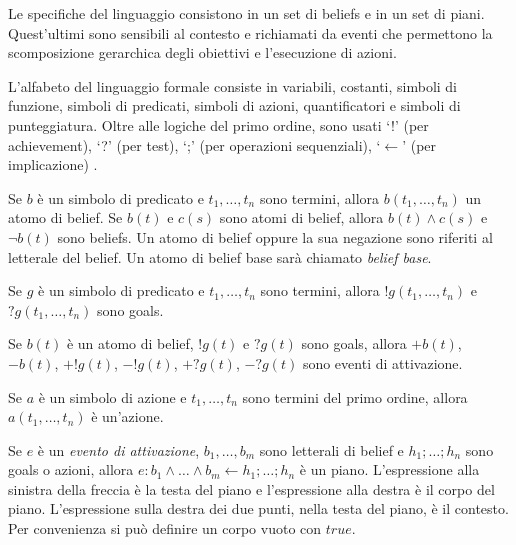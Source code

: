 \medskip
Le specifiche del linguaggio consistono in un set di beliefs e in un set di piani. Quest'ultimi sono sensibili al contesto e richiamati da eventi che permettono la scomposizione gerarchica degli obiettivi e l'esecuzione di azioni.

L'alfabeto del linguaggio formale consiste in variabili, costanti, simboli di funzione, simboli di predicati, simboli di azioni, quantificatori e simboli di punteggiatura. Oltre alle logiche del primo ordine, sono usati `!' (per achievement), `?' (per test), `;' (per operazioni sequenziali), `$\leftarrow$' (per implicazione) \cite{AgentSpeak(L)}.

\smallskip
\begin{defn}
Se $b$ è un simbolo di predicato e $t_1, \ldots, t_n$ sono termini, allora $b(t_1, \ldots, t_n)$ un atomo di belief. Se $b(t)$ e $c(s)$ sono atomi di belief, allora $b(t) \wedge c(s)$ e $\neg b(t)$ sono beliefs. Un atomo di belief oppure la sua negazione sono riferiti al letterale del belief. Un atomo di belief base sarà chiamato \emph{belief base}.
\end{defn}

\smallskip
\begin{defn}
Se $g$ è un simbolo di predicato e $t_1, \ldots, t_n$ sono termini, allora $!g(t_1, \ldots, t_n)$ e $?g(t_1, \ldots, t_n)$ sono goals.
\end{defn}

\smallskip
\begin{defn}
Se $b(t)$ è un atomo di belief, $!g(t)$ e $?g(t)$ sono goals, allora $+b(t)$, $-b(t)$, $+!g(t)$, $-!g(t)$, $+?g(t)$, $-?g(t)$ sono eventi di attivazione.
\end{defn}

\smallskip
\begin{defn}
Se $a$ è un simbolo di azione e $t_1, \ldots, t_n$ sono termini del primo ordine, allora $a(t_1, \ldots, t_n)$ è un'azione.
\end{defn}

\smallskip
\begin{defn}
Se $e$ è un \textit{evento di attivazione}, $b_1, \ldots, b_m$ sono letterali di belief e $h_1; \ldots; h_n$ sono goals o azioni, allora $e : b_1 \land \ldots \land b_m \leftarrow h_1; \ldots; h_n$ è un piano. L'espressione alla sinistra della freccia è la testa del piano e l'espressione alla destra è il corpo del piano. L'espressione sulla destra dei due punti, nella testa del piano, è il contesto. Per convenienza si può definire un corpo vuoto con $true$.
\end{defn}

